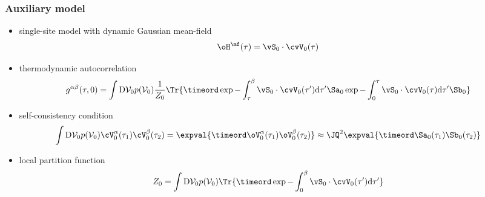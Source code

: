 \begin{frame}
	\frametitle{ Auxiliary model }
    \begin{itemize}
        \item single-site model with dynamic Gaussian mean-field
        \begin{align*}
            \oH^{\mf}(\tau) &= \vS_0 \cdot \cvV_0(\tau)
        \end{align*}
        \item thermodynamic autocorrelation 
        \begin{align*}
            g^{\alpha\beta}(\tau,0) &= \int \mathrm{D}\mathcal{V}_0 p(\mathcal{V}_0) \frac{1}{Z_0} \Tr{ \timeord \exp{ -\int_\tau^\beta \vS_0 \cdot \cvV_0(\tau') \mathrm{d}\tau' } \Sa_0 \exp{ - \int_0^\tau \vS_0 \cdot \cvV_0(\tau) \mathrm{d}\tau' } \Sb_0 }
        \end{align*}
        \item self-consistency condition
        \begin{align*}
            \int \mathrm{D}\mathcal{V}_0 p(\mathcal{V}_0) \cV_0^{\alpha} (\tau_1) \cV_0^{\beta} (\tau_2) &= \expval{ \timeord \oV_0^{\alpha} (\tau_1) \oV_0^{\beta} (\tau_2) } \approx \JQ^2 \expval{ \timeord \Sa_0(\tau_1) \Sb_0 (\tau_2) }
        \end{align*}
        \item local partition function
        \begin{align*}
            Z_0 &= \int \mathrm{D}\mathcal{V}_0 p(\mathcal{V}_0) \Tr{ \timeord \exp{ -\int_0^\beta \vS_0 \cdot \cvV_0(\tau') \mathrm{d}\tau' } }
        \end{align*}
    \end{itemize}
\end{frame}